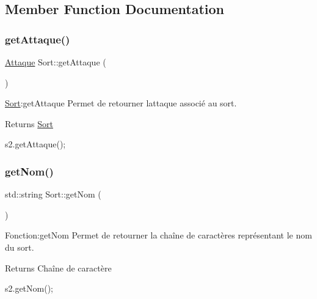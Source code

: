 \subsection{Member Function Documentation}
\mbox{\label{classSort_ac24b0d4c2caf033df5ddcc3f281bc634}} 
\subsubsection{\texorpdfstring{get\+Attaque()}{getAttaque()}}
{\footnotesize\ttfamily \hyperlink{classAttaque}{Attaque} Sort\+::get\+Attaque (\begin{DoxyParamCaption}{ }\end{DoxyParamCaption})}



\hyperlink{classSort}{Sort}\+:get\+Attaque Permet de retourner l\textquotesingle{}attaque associé au sort. 

\begin{DoxyReturn}{Returns}
\hyperlink{classSort}{Sort} 
\begin{DoxyCode}
s2.getAttaque();
\end{DoxyCode}
 
\end{DoxyReturn}
\mbox{\label{classSort_a249f3b41badad1b1fa14b3bf6d3736f3}} 
\subsubsection{\texorpdfstring{get\+Nom()}{getNom()}}
{\footnotesize\ttfamily std\+::string Sort\+::get\+Nom (\begin{DoxyParamCaption}{ }\end{DoxyParamCaption})}



Fonction\+:get\+Nom Permet de retourner la chaîne de caractères représentant le nom du sort. 

\begin{DoxyReturn}{Returns}
Chaîne de caractère 
\begin{DoxyCode}
s2.getNom();
\end{DoxyCode}
 
\end{DoxyReturn}
\mbox{\label{classSort_ae8380b142e31fdad8afae89bbfaeffc5}} 
